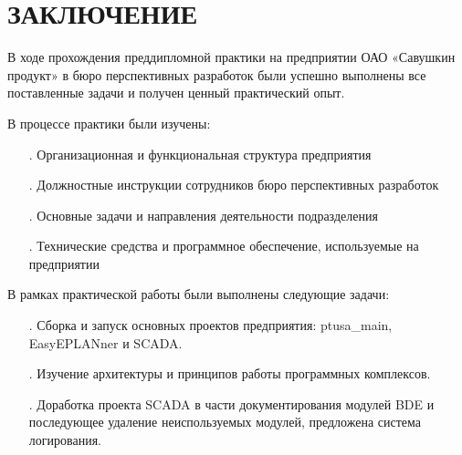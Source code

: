 \sectionbreak \section*{
	\gostTitleFont
	\redline
	ЗАКЛЮЧЕНИЕ
}

\subtitlespace

{\gostFont

	\par \redline В ходе прохождения преддипломной практики на предприятии ОАО «Савушкин продукт» в бюро перспективных разработок были успешно выполнены все поставленные задачи и получен ценный практический опыт.

	\par \redline В процессе практики были изучены:
	\begin{itemize}[leftmargin=2.15cm, labelwidth=0.65cm, labelsep=0.0cm] 

		\item[\theitemcntr.] Организационная и функциональная структура предприятия
		\addtocounter{itemcntr}{1}

		\item[\theitemcntr.] Должностные инструкции сотрудников бюро перспективных разработок
		\addtocounter{itemcntr}{1}

		\item[\theitemcntr.] Основные задачи и направления деятельности подразделения
		\addtocounter{itemcntr}{1}

		\item[\theitemcntr.] Технические средства и программное обеспечение, используемые на предприятии
		\addtocounter{itemcntr}{1}

		\setcounter{itemcntr}{1}
		\end{itemize}

		\par \redline В рамках практической работы были выполнены следующие задачи:
		\begin{itemize}[leftmargin=2.15cm, labelwidth=0.65cm, labelsep=0.0cm] 

		\item[\theitemcntr.] Сборка и запуск основных проектов предприятия: ptusa\_main, EasyEPLANner и SCADA.
		\addtocounter{itemcntr}{1}

		\item[\theitemcntr.] Изучение архитектуры и принципов работы программных комплексов.
		\addtocounter{itemcntr}{1}

		\item[\theitemcntr.] Доработка проекта SCADA в части документирования модулей BDE и последующее удаление неиспользуемых модулей, предложена система логирования.
		\addtocounter{itemcntr}{1}


\end{itemize}}
